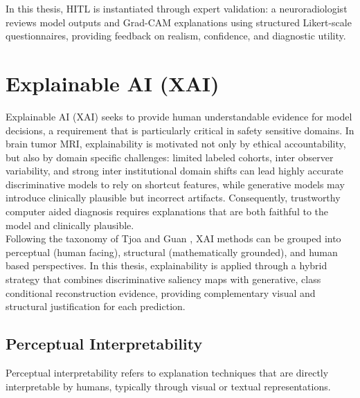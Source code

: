 In this thesis, HITL is instantiated through expert validation: a neuroradiologist reviews model outputs and Grad-CAM explanations using structured Likert-scale questionnaires, providing feedback on realism, confidence, and diagnostic utility.



\section{Explainable AI (XAI)}

Explainable AI (XAI) seeks to provide human understandable evidence for model decisions, a requirement that is particularly critical in safety sensitive domains. In brain tumor MRI, explainability is motivated not only by ethical accountability, but also by domain specific challenges: limited labeled cohorts, inter observer variability, and strong inter institutional domain shifts can lead highly accurate discriminative models to rely on shortcut features, while generative models may introduce clinically plausible but incorrect artifacts. Consequently, trustworthy computer aided diagnosis requires explanations that are both faithful to the model and clinically plausible.\\

Following the taxonomy of Tjoa and Guan \cite{9233366}, XAI methods can be grouped into perceptual (human facing), structural (mathematically grounded), and human based perspectives. In this thesis, explainability is applied through a hybrid strategy that combines discriminative saliency maps with generative, class conditional reconstruction evidence, providing complementary visual and structural justification for each prediction.

\subsection{Perceptual Interpretability}

Perceptual interpretability refers to explanation techniques that are directly interpretable by humans, typically through visual or textual representations.

